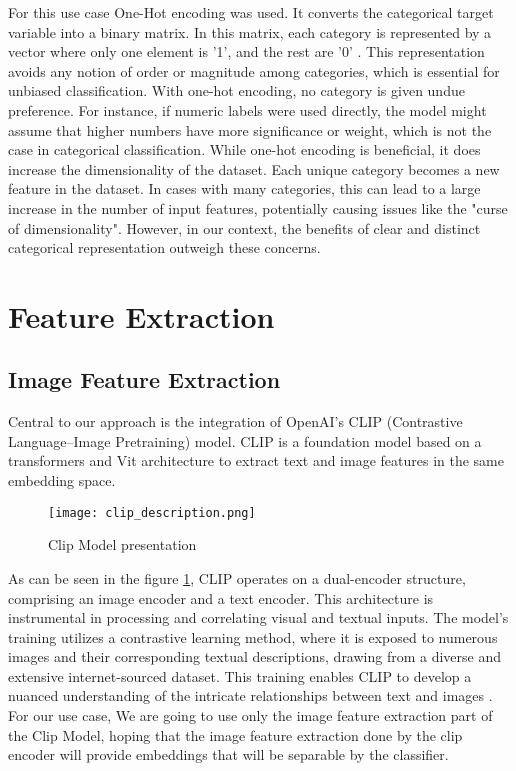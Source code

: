 For this use case One-Hot encoding was used. It converts the categorical target variable into a binary matrix. In this matrix, each category is represented by a vector where only one element is '1', and the rest are '0' \cite{cerda-2018}. This representation avoids any notion of order or magnitude among categories, which is essential for unbiased classification.
With one-hot encoding, no category is given undue preference. For instance, if numeric labels were used directly, the model might assume that higher numbers have more significance or weight, which is not the case in categorical classification.
While one-hot encoding is beneficial, it does increase the dimensionality of the dataset. Each unique category becomes a new feature in the dataset. In cases with many categories, this can lead to a large increase in the number of input features, potentially causing issues like the "curse of dimensionality"\cite{altman-2018}. However, in our context, the benefits of clear and distinct categorical representation outweigh these concerns.


\section{Feature Extraction}

\subsection{Image Feature Extraction}

Central to our approach is the integration of OpenAI's CLIP (Contrastive Language–Image Pretraining) model. CLIP is a foundation model based on a transformers and Vit architecture to extract text and image features in the same embedding space.


\begin{figure}[H]
    \centering
    \texttt{[image: clip\_description.png]}
    \caption{\label{fig:clip-architecture}Clip Model presentation}
\end{figure}


As can be seen in the figure \ref{fig:clip-architecture}, CLIP operates on a dual-encoder structure, comprising an image encoder and a text encoder. This architecture is instrumental in processing and correlating visual and textual inputs. The model's training utilizes a contrastive learning method, where it is exposed to numerous images and their corresponding textual descriptions, drawing from a diverse and extensive internet-sourced dataset. This training enables CLIP to develop a nuanced understanding of the intricate relationships between text and images \cite{radford-2021}.
For our use case, We are going to use only the image feature extraction part of the Clip Model, hoping that the image feature extraction done by the clip encoder will provide embeddings that will be separable by the classifier.




